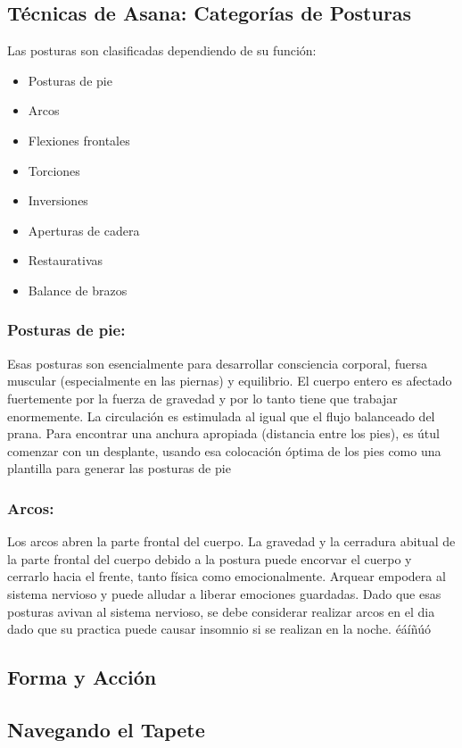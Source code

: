 \subsection{Técnicas de Asana: Categorías de Posturas}
Las posturas son clasificadas dependiendo de su función:

\begin{itemize}
	\item Posturas de pie
	\item Arcos
	\item Flexiones frontales
	\item Torciones
	\item Inversiones
	\item Aperturas de cadera
	\item Restaurativas
	\item Balance de brazos
\end{itemize}

\subsubsection{Posturas de pie:}
Esas posturas son esencialmente para desarrollar consciencia corporal, fuersa muscular (especialmente en las piernas) y equilibrio. El cuerpo entero es afectado fuertemente por la fuerza de gravedad y por lo tanto tiene que trabajar enormemente. La circulación es estimulada al igual que el flujo balanceado del prana. Para encontrar una anchura apropiada (distancia entre los pies), es útul comenzar con un desplante, usando esa colocación óptima de los pies como una plantilla para generar las posturas de pie

\subsubsection{Arcos:}
Los arcos abren la parte frontal del cuerpo. La gravedad y la cerradura abitual de la parte frontal del cuerpo debido a la postura puede encorvar el cuerpo y cerrarlo hacia el frente, tanto física como emocionalmente. Arquear empodera al sistema nervioso y puede alludar a liberar emociones guardadas. Dado que esas posturas avivan al sistema nervioso, se debe considerar realizar arcos en el dia dado que su practica puede causar insomnio si se realizan en la noche.
éáíñúó

\subsection{Forma y Acción}
\subsection{Navegando el Tapete}
